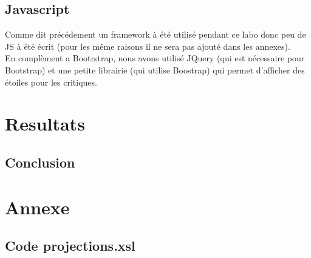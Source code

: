 \documentclass[french]{article}
\begin{document}
    \subsection{Javascript}
    Comme dit précédement un framework à été utilisé pendant ce labo donc peu de
    JS à été écrit (pour les même raisons il ne sera pas ajouté dans les annexes).
    \\ En complèment a Bootrstrap, nous avons utilisé JQuery (qui est nécessaire
    pour Bootstrap) et une petite librairie (qui utilise Boostrap) qui permet
    d'afficher des étoiles pour les critiques.

    \section{Resultats}
    

    \subsection{Conclusion}


    \newpage

    \section{Annexe}
    \subsection{Code projections.xsl}
    
\end{document}
